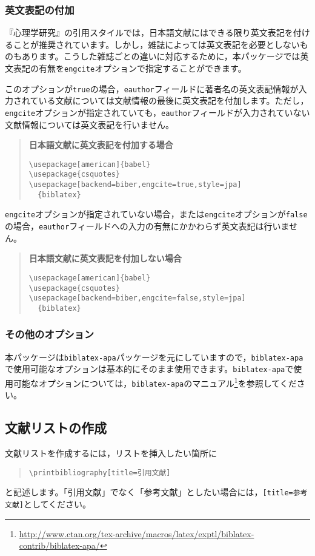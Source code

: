 \documentclass[12pt]{ltjsarticle}
\begin{document}
\subsubsection{英文表記の付加}
『心理学研究』の引用スタイルでは，日本語文献にはできる限り英文表記を付けることが推奨されています。しかし，雑誌によっては英文表記を必要としないものもあります。こうした雑誌ごとの違いに対応するために，本パッケージでは英文表記の有無を\texttt{engcite}オプションで指定することができます。

このオプションが\texttt{true}の場合，\texttt{eauthor}フィールドに著者名の英文表記情報が入力されている文献については文献情報の最後に英文表記を付加します。ただし，\texttt{engcite}オプションが指定されていても，\texttt{eauthor}フィールドが入力されていない文献情報については英文表記を行いません。

\begin{quote}
\textbf{日本語文献に英文表記を付加する場合}
\begin{verbatim}
\usepackage[american]{babel}
\usepackage{csquotes}
\usepackage[backend=biber,engcite=true,style=jpa]
  {biblatex}
\end{verbatim}
\end{quote}

\texttt{engcite}オプションが指定されていない場合，または\texttt{engcite}オプションが\texttt{false}の場合，\texttt{eauthor}フィールドへの入力の有無にかかわらず英文表記は行いません。

\begin{quote}
\textbf{日本語文献に英文表記を付加しない場合}
\begin{verbatim}
\usepackage[american]{babel}
\usepackage{csquotes}
\usepackage[backend=biber,engcite=false,style=jpa]
  {biblatex}
\end{verbatim}
\end{quote}


\subsubsection{その他のオプション}
本パッケージは\texttt{biblatex-apa}パッケージを元にしていますので，\texttt{biblatex-apa}で使用可能なオプションは基本的にそのまま使用できます。\texttt{biblatex-apa}で使用可能なオプションについては，\texttt{biblatex-apa}のマニュアル\footnote{\url{http://www.ctan.org/tex-archive/macros/latex/exptl/biblatex-contrib/biblatex-apa/}}を参照してください。

\subsection{文献リストの作成}
文献リストを作成するには，リストを挿入したい箇所に
\begin{quote}
  \texttt{\textbackslash{printbibliography[title=引用文献]}}
\end{quote}
と記述します。「引用文献」でなく「参考文献」としたい場合には，\texttt{[title=参考文献]}としてください。
\end{document}
